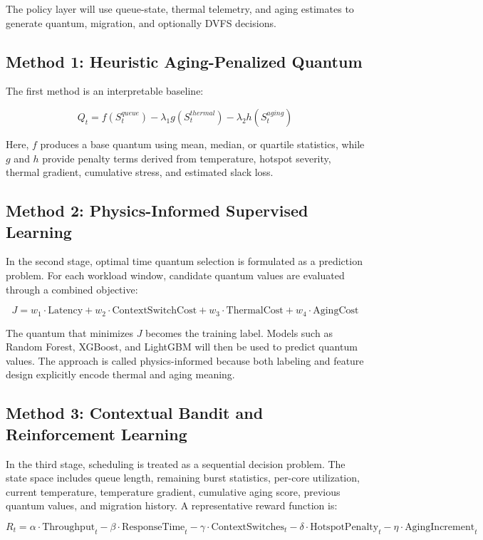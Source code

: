 \documentclass[12pt,a4paper]{article}
\begin{document}
The policy layer will use queue-state, thermal telemetry, and aging estimates to generate quantum,
migration, and optionally DVFS decisions.

\subsection{Method 1: Heuristic Aging-Penalized Quantum}

The first method is an interpretable baseline:

\[
Q_t = f(S^{queue}_t) - \lambda_1 g(S^{thermal}_t) - \lambda_2 h(S^{aging}_t)
\]

Here, $f$ produces a base quantum using mean, median, or quartile statistics, while $g$ and $h$ provide
penalty terms derived from temperature, hotspot severity, thermal gradient, cumulative stress, and estimated
slack loss.

\subsection{Method 2: Physics-Informed Supervised Learning}

In the second stage, optimal time quantum selection is formulated as a prediction problem. For each workload
window, candidate quantum values are evaluated through a combined objective:

\[
J = w_1 \cdot \text{Latency} + w_2 \cdot \text{ContextSwitchCost} + w_3 \cdot \text{ThermalCost} + w_4 \cdot \text{AgingCost}
\]

The quantum that minimizes $J$ becomes the training label. Models such as Random Forest, XGBoost, and LightGBM
will then be used to predict quantum values. The approach is called physics-informed because both labeling and
feature design explicitly encode thermal and aging meaning.

\subsection{Method 3: Contextual Bandit and Reinforcement Learning}

In the third stage, scheduling is treated as a sequential decision problem. The state space includes queue length,
remaining burst statistics, per-core utilization, current temperature, temperature gradient, cumulative aging score,
previous quantum values, and migration history. A representative reward function is:

\[
R_t = \alpha \cdot \text{Throughput}_t - \beta \cdot \text{ResponseTime}_t - \gamma \cdot \text{ContextSwitches}_t - \delta \cdot \text{HotspotPenalty}_t - \eta \cdot \text{AgingIncrement}_t
\]
\end{document}
